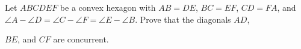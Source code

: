Let 
$ABCDEF$
 be a convex hexagon with 
$AB=DE$, 
$BC=EF$,
$CD=FA$, 
 and 
$\angle A-\angle D = \angle C -\angle F = \angle E -\angle B$.
 Prove that the diagonals 
$AD$, 
 
$BE$, 
 and 
$CF$
 are concurrent.
